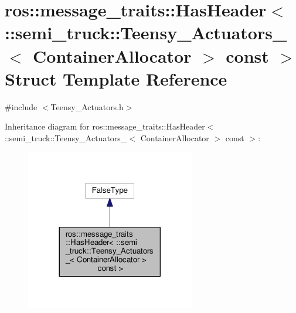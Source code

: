 \hypertarget{structros_1_1message__traits_1_1_has_header_3_01_1_1semi__truck_1_1_teensy___actuators___3_01_coe86513e6694fc989720644eb04b2c486}{}\section{ros\+:\+:message\+\_\+traits\+:\+:Has\+Header$<$ \+:\+:semi\+\_\+truck\+:\+:Teensy\+\_\+\+Actuators\+\_\+$<$ Container\+Allocator $>$ const $>$ Struct Template Reference}
\label{structros_1_1message__traits_1_1_has_header_3_01_1_1semi__truck_1_1_teensy___actuators___3_01_coe86513e6694fc989720644eb04b2c486}


{\ttfamily \#include $<$Teensy\+\_\+\+Actuators.\+h$>$}



Inheritance diagram for ros\+:\+:message\+\_\+traits\+:\+:Has\+Header$<$ \+:\+:semi\+\_\+truck\+:\+:Teensy\+\_\+\+Actuators\+\_\+$<$ Container\+Allocator $>$ const $>$\+:\nopagebreak
\begin{figure}[H]
\begin{center}
\leavevmode
\includegraphics[width=209pt]{structros_1_1message__traits_1_1_has_header_3_01_1_1semi__truck_1_1_teensy___actuators___3_01_co21e737ff7bf090f0bf05daab3f8c4a3d}
\end{center}
\end{figure}


